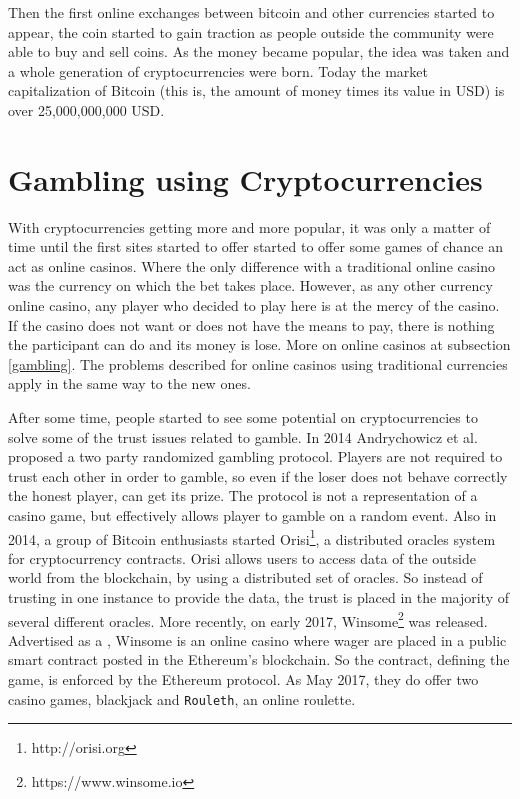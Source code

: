 Then the first online exchanges between bitcoin and other currencies started
  to appear, the coin started to gain traction as people outside the community
  were able to buy and sell coins. As the money became popular, the idea was
  taken and a whole generation of cryptocurrencies were born. Today the
  market capitalization of Bitcoin (this is, the amount of money times its
  value in USD) is over 25,000,000,000 USD.

\section{Gambling using Cryptocurrencies}

With cryptocurrencies getting more and more popular, it was only a matter of
  time until the first sites started to offer started to offer some games of
  chance an act as online casinos. Where the only difference with a traditional
  online casino was the currency on which the bet takes place.
However, as any other currency online casino, any player who decided to play
  here is at the mercy of the casino. If the casino does not want or does not
  have the means to pay, there is nothing the participant can do and its money
  is lose. More on online casinos at subsection \ref{gambling}. The problems
  described for online casinos using traditional currencies apply in the same
  way to the new ones.

After some time, people started to see some potential on cryptocurrencies to
  solve some of the trust issues related to gamble. In 2014 Andrychowicz et
  al. proposed a two party randomized gambling
  protocol. Players are not required to trust each other in order to gamble, so
  even if the loser does not behave correctly the honest player, can get its
  prize.
The protocol is not a representation of a casino game, but effectively allows
  player to gamble on a random event.
Also in 2014, a group of Bitcoin enthusiasts started
  Orisi\footnote{http://orisi.org},  a distributed oracles system for
  cryptocurrency contracts.
Orisi allows users to access data of the outside world from the blockchain,
  by using a distributed set of oracles. So instead of trusting in one instance
  to provide the data, the trust is placed in the majority of several different
  oracles.
More recently, on early 2017, Winsome\footnote{https://www.winsome.io} was
  released. Advertised as a , Winsome
  is an online casino where wager are placed in a public smart contract posted
  in the Ethereum's blockchain. So the contract, defining the game, is enforced
  by the Ethereum protocol. As May 2017, they do offer two casino games,
  blackjack and \texttt{Rouleth}, an online roulette.

